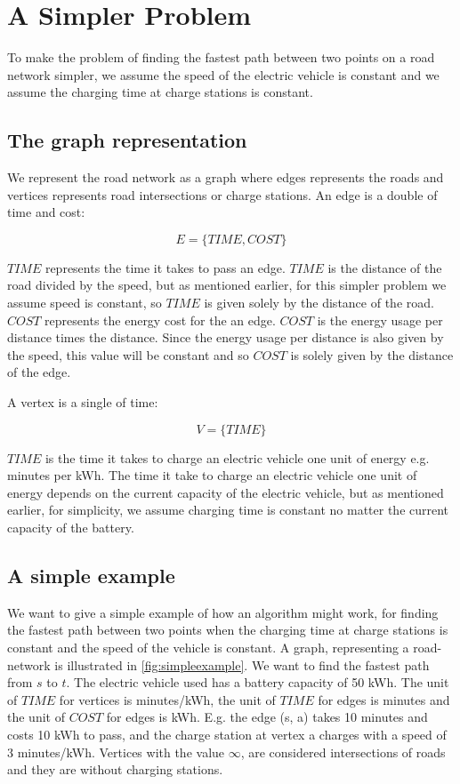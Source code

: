 \section{A Simpler Problem}

To make the problem of finding the fastest path between two points on a road network simpler, 
we assume the speed of the electric vehicle is constant and we assume the charging time at
charge stations is constant. 

\subsection{The graph representation}
We represent the road network as a graph where edges represents the roads and vertices represents
road intersections or charge stations. An edge is a double of time and cost:

\[E = \{\textit{TIME}, \textit{COST}\} \]

$\textit{TIME}$ represents the time it takes to pass an edge. $\textit{TIME}$ is the distance of
the road divided by the speed, but as mentioned earlier, for this simpler problem we assume
speed is constant, so $\textit{TIME}$ is given solely by the distance of the road. $\textit{COST}$ 
represents the energy cost for the an edge. $\textit{COST}$ is the energy usage per distance 
times the distance. Since the energy usage per distance is also given by the speed, this value
will be constant and so $\textit{COST}$ is solely given by the distance of the edge.

A vertex is a single of time: 
 
\[V = \{\textit{TIME}\} \]

$\textit{TIME}$ is the time it takes to charge an electric vehicle one unit of energy e.g. minutes 
per kWh. The time it take to charge an electric vehicle one unit of energy depends on the current
capacity of the electric vehicle, but as mentioned earlier, for simplicity, we assume charging 
time is constant no matter the current capacity of the battery.

\subsection{A simple example}

We want to give a simple example of how an algorithm might work, for finding the fastest path 
between two points when the charging time at charge stations is constant and the speed of the 
vehicle is constant. A graph, representing a road-network is illustrated in \ref{fig:simpleexample}. 
We want to find the fastest path from $s$ to $t$. The electric vehicle used has a battery capacity 
of 50 kWh. The unit of $\textit{TIME}$ for vertices is minutes/kWh, the unit of $\textit{TIME}$ 
for edges is minutes and the unit of $\textit{COST}$ for edges is kWh. E.g. the edge (s, a) takes 
10 minutes and costs 10 kWh to pass, and the charge station at vertex a charges with a speed of 
3 minutes/kWh. Vertices with the value $\infty$, are considered intersections of roads and they are 
without charging stations.  

